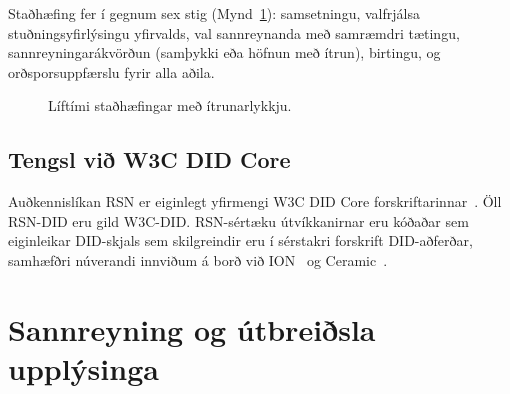 \documentclass[11pt,a4paper,twocolumn]{article}
\begin{document}
Staðhæfing fer í gegnum sex stig (Mynd~\ref{fig:lifecycle}): samsetningu, valfrjálsa stuðningsyfirlýsingu yfirvalds, val sannreynanda með samræmdri tætingu, sannreyningarákvörðun (samþykki eða höfnun með ítrun), birtingu, og orðsporsuppfærslu fyrir alla aðila.

\begin{figure}[ht]
\centering
{}
\caption{Líftími staðhæfingar með ítrunarlykkju.}
\label{fig:lifecycle}
\end{figure}

\subsection{Tengsl við W3C DID Core}

Auðkennislíkan RSN er eiginlegt yfirmengi W3C DID Core forskriftarinnar~\cite{did2022}. Öll RSN-DID eru gild W3C-DID. RSN-sértæku útvíkkanirnar eru kóðaðar sem eiginleikar DID-skjals sem skilgreindir eru í sérstakri forskrift DID-aðferðar, samhæfðri núverandi innviðum á borð við ION~\cite{buchner2021} og Ceramic~\cite{ceramic2023}.

\section{Sannreyning og útbreiðsla upplýsinga}
\end{document}
